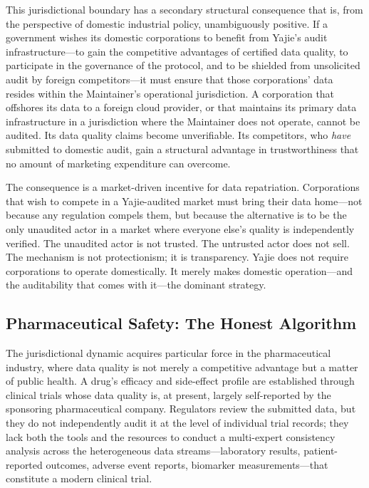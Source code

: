 \documentclass[12pt,a4paper]{ctexart}
\theoremstyle{definition}
\theoremstyle{remark}
\begin{document}
This jurisdictional boundary has a secondary structural consequence that is, from the perspective of domestic industrial policy, unambiguously positive. If a government wishes its domestic corporations to benefit from Yajie's audit infrastructure—to gain the competitive advantages of certified data quality, to participate in the governance of the protocol, and to be shielded from unsolicited audit by foreign competitors—it must ensure that those corporations' data resides within the Maintainer's operational jurisdiction. A corporation that offshores its data to a foreign cloud provider, or that maintains its primary data infrastructure in a jurisdiction where the Maintainer does not operate, cannot be audited. Its data quality claims become unverifiable. Its competitors, who \textit{have} submitted to domestic audit, gain a structural advantage in trustworthiness that no amount of marketing expenditure can overcome.

The consequence is a market-driven incentive for data repatriation. Corporations that wish to compete in a Yajie-audited market must bring their data home—not because any regulation compels them, but because the alternative is to be the only unaudited actor in a market where everyone else's quality is independently verified. The unaudited actor is not trusted. The untrusted actor does not sell. The mechanism is not protectionism; it is transparency. Yajie does not require corporations to operate domestically. It merely makes domestic operation—and the auditability that comes with it—the dominant strategy.

\subsection{Pharmaceutical Safety: The Honest Algorithm}

The jurisdictional dynamic acquires particular force in the pharmaceutical industry, where data quality is not merely a competitive advantage but a matter of public health. A drug's efficacy and side-effect profile are established through clinical trials whose data quality is, at present, largely self-reported by the sponsoring pharmaceutical company. Regulators review the submitted data, but they do not independently audit it at the level of individual trial records; they lack both the tools and the resources to conduct a multi-expert consistency analysis across the heterogeneous data streams—laboratory results, patient-reported outcomes, adverse event reports, biomarker measurements—that constitute a modern clinical trial.
\end{document}
